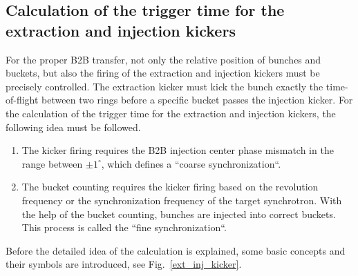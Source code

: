 \subsection{Calculation of the trigger time for the extraction and injection kickers}
\label{sec:compensation}
For the proper B2B transfer, not only the relative position of bunches and buckets, but also the firing of the extraction and injection kickers must be precisely controlled. The extraction kicker must kick the bunch exactly the time-of-flight between two rings before a specific bucket passes the injection kicker. For the calculation of the trigger time for the extraction and injection kickers, the following idea must be followed. 
\begin{enumerate}
\item The kicker firing requires the B2B injection center phase mismatch in the range between $\pm 1^\circ$, which defines a ``coarse synchronization``.
\item The bucket counting requires the kicker firing based on the revolution frequency or the synchronization frequency of the target synchrotron. With the help of the bucket counting, bunches are injected into correct buckets. This process is called the ``fine synchronization``.
\end{enumerate}

Before the detailed idea of the calculation is explained, some basic concepts and their symbols are introduced, see Fig.~\ref{ext_inj_kicker}.

